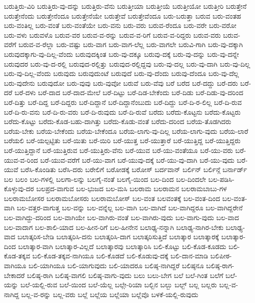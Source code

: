 {ಬರುತ್ತಿರು-ವಿರಿ
ಬರುತ್ತಿರು-ವು-ದನ್ನು
ಬರುತ್ತಿರು-ವೆನು
ಬರುತ್ತೀಯಾ
ಬರುತ್ತೀಯೆ
ಬರುತ್ತೀಯೋ
ಬರುತ್ತೀರಿ
ಬರುತ್ತೇನೆ
ಬರುತ್ತೇನೆಂದು
ಬರುತ್ತೇನೆಂದೂ
ಬರುತ್ತೇನೆಯೇ
ಬರುತ್ತೇವೆ
ಬರುತ್ತೇವೆಂದೂ
ಬರು-ಬರುತ್ತಾ
ಬರುವ
ಬರು-ವಂತಹ
ಬರು-ವಂತಿಲ್ಲ
ಬರು-ವಂತೆ
ಬರು-ವಂತೆಯೇ
ಬರು-ವನು
ಬರು-ವರು
ಬರುವ-ರೆಂದೂ
ಬರು-ವರೇ
ಬರು-ವರೋ
ಬರು-ವಳು
ಬರುವಳೊ
ಬರುವ-ವರ
ಬರುವ-ವ-ರನ್ನು
ಬರುವ-ವ-ರಿಗೆ
ಬರುವ-ವ-ರಿದ್ದರು
ಬರುವ-ವರು
ಬರುವ-ವರೆಗೆ
ಬರುವ-ವ-ರೆಲ್ಲಾ
ಬರು-ವಷ್ಟು
ಬರು-ವಾಗ
ಬರು-ವಾಗ-ಲೆಲ್ಲ
ಬರು-ವಾಗಲೇ
ಬರುವಿ-ಗಾಗಿ
ಬರು-ವು-ದಕ್ಕಾಗಿ
ಬರುವುದಕ್ಕಾಗು-ವು-ದಿಲ್ಲ-ವೆಂದು
ಬರುವುದಕ್ಕಿಂತ
ಬರು-ವು-ದಕ್ಕೂ
ಬರುವು-ದಕ್ಕೆ
ಬರು-ವು-ದನ್ನು
ಬರು-ವು-ದನ್ನೇ
ಬರುವುದರ
ಬರು-ವು-ದ-ರಲ್ಲಿ
ಬರುವುದ-ರಲ್ಲಿತ್ತು
ಬರುವುದ-ರಲ್ಲಿದ್ದವು
ಬರು-ವು-ದಲ್ಲ
ಬರು-ವು-ದಾಗಿ
ಬರು-ವು-ದಿಲ್ಲ
ಬರು-ವು-ದಿಲ್ಲ-ವೆಂದು
ಬರುವುದು
ಬರುವುದುಂಟೆ
ಬರುವುದೆ
ಬರು-ವು-ದೆಂದು
ಬರುವು-ದೆಂದೂ
ಬರು-ವು-ದೆಲ್ಲ
ಬರು-ವುದೇನು
ಬರುವುದೋ
ಬರು-ವುವು
ಬರು-ವುವೋ
ಬರುವೆ
ಬರು-ವೆವು
ಬರೆ
ಬರೆದ
ಬರೆ-ದದ್ದು
ಬರೆ-ದರು
ಬರೆ-ದರೆ
ಬರೆ-ದಳು
ಬರೆ-ದಾದ
ಬರೆ-ದಾದ-ಮೇಲೆ
ಬರೆ-ದಿಟ್ಟು
ಬರೆ-ದಿಡ-ಬೇಕೆಂದು
ಬರೆ-ದಿಡು
ಬರೆ-ದಿಡು-ವು-ದರಿಂದ
ಬರೆ-ದಿತ್ತು
ಬರೆ-ದಿದ್ದ
ಬರೆ-ದಿದ್ದರು
ಬರೆ-ದಿದ್ದಾನೆ
ಬರೆ-ದಿದ್ದಾನೆಂಬುದು
ಬರೆ-ದಿದ್ದು
ಬರೆ-ದಿ-ರ-ಲಿಲ್ಲ
ಬರೆ-ದಿ-ರುವ
ಬರೆ-ದಿ-ರು-ವನು
ಬರೆ-ದಿ-ರು-ವರು
ಬರೆ-ದಿ-ರುವುದು
ಬರೆ-ದಿ-ರುವೆ
ಬರೆದು
ಬರೆದು-ಕೊಟ್ಟನು
ಬರೆದು-ಕೊಟ್ಟರು
ಬರೆದು-ಕೊಟ್ಟು
ಬರೆದು-ಕೊಡ-ಬಹು-ದಾಗಿತ್ತು
ಬರೆದು-ಕೊಡು-ವಂತೆ
ಬರೆದು-ದರಿಂದ
ಬರೆಯ-ತೊಡಗಿದರು
ಬರೆಯ-ಬೇಕು
ಬರೆಯ-ಬೇಕೆಂದು
ಬರೆಯ-ಬೇಕೆಂದೂ
ಬರೆಯ-ಲಾಗು-ವು-ದಿಲ್ಲ
ಬರೆಯ-ಲಾಗು-ವುದು
ಬರೆಯ-ಲಾರೆ
ಬರೆಯಲಿ
ಬರೆ-ಯಲ್ಪಟ್ಟಿತು
ಬರೆ-ಯಿತು
ಬರೆ-ಯಿರಿ
ಬರೆ-ಯುತ್ತ
ಬರೆ-ಯುತ್ತಾರೆ
ಬರೆ-ಯುತ್ತಿದ್ದ
ಬರೆ-ಯುತ್ತಿದ್ದರು
ಬರೆ-ಯುತ್ತಿದ್ದಾನೆ
ಬರೆ-ಯುತ್ತಿರುವ
ಬರೆ-ಯುತ್ತಿರು-ವೆನು
ಬರೆ-ಯುವ
ಬರೆ-ಯು-ವಂತೆಯೂ
ಬರೆ-ಯು-ವರು
ಬರೆ-ಯುವ-ವ-ರಿಂದ
ಬರೆ-ಯುವ-ವರೆಗೆ
ಬರೆ-ಯು-ವಾಗ
ಬರೆ-ಯುವು-ದಕ್ಕೆ
ಬರೆ-ಯು-ವು-ದಾಗಿ
ಬರೆ-ಯು-ವುದು
ಬರೆ-ಯುವೆ
ಬರೆಸಿ-ಕೊಂಡಿತು
ಬರೆಸಿ-ದರು
ಬರೇಲಿಗೆ
ಬರೋಡಕ್ಕೆ
ಬರೋಸ್
ಬರ್ದವಾನ್
ಬರ್ಲಿನ್
ಬರ್ಲಿನ್ಗೆ
ಬರ್ನಾರ್ಡ್
ಬಲ
ಬಲಂ
ಬಲ-ಗಳಲ್ಲಿ
ಬಲಗಾ-ಲನ್ನು
ಬಲಗೈ-ನಂತೆ
ಬಲಗೈ-ಯಿಂದ
ಬಲ-ದಿಂದ
ಬಲ-ದಿಂದಲೇ
ಬಲ-ಪಡಿಸಿ-ಕೊಳ್ಳುವು-ದರ
ಬಲಪ್ರದ-ವಾಗುವ
ಬಲ-ಭುಜದ
ಬಲ-ಮಸಿ
ಬಲರಾಮ
ಬಲರಾಮನ
ಬಲರಾಮಬಾಬು-ಗಳ
ಬಲರಾಮಬೋಸರ
ಬಲರಾಮಬೋಸರು
ಬಲರಾಮಬೋಸ್
ಬಲ-ವಂತ
ಬಲವಂತಕ್ಕೆ
ಬಲ-ವಂತ-ದಿಂದ
ಬಲ-ವಂತ-ವಾಗಿ
ಬಲ-ವತ್ತರ-ವಾಗುತ್ತ
ಬಲ-ವನ್ನು
ಬಲ-ವನ್ನೆಲ್ಲ
ಬಲ-ವಾಗಿ
ಬಲ-ವಾಗಿದೆ
ಬಲ-ವಾಗಿದ್ದರೂ
ಬಲ-ವಾಗಿದ್ದರೇನೆ
ಬಲ-ವಾಗಿದ್ದು-ದರಿಂದ
ಬಲ-ವಾಗಿಯೇ
ಬಲ-ವಾಗಿರು-ವಂತೆ
ಬಲ-ವಾಗಿರು-ವುದು
ಬಲ-ವಾಗು-ವುದು
ಬಲ-ವಾದ
ಬಲ-ವಾದಾಗ
ಬಲ-ಶಾಲಿ-ಯಾದ
ಬಲ-ಹೀನ-ರಿಗೆ
ಬಲ-ಹೀನೇನ
ಬಲಾಢ್ಯ-ನನ್ನಾಗಿ
ಬಲಾಢ್ಯ-ನಾಗಿರ-ಬೇಕು
ಬಲಾಢ್ಯ-ವಾದ
ಬಲಾತ್ಕರಿಸ-ಬೇಡಿ
ಬಲಾತ್ಕರಿಸಿ-ದನು
ಬಲಾತ್ಕರಿಸಿ-ದಾಗ
ಬಲಾತ್ಕರಿಸುತ್ತಿದೆ
ಬಲಾತ್ಕಾರ
ಬಲಾತ್ಕಾರಕ್ಕೆ
ಬಲಾತ್ಕಾರ-ದಿಂದ
ಬಲಾತ್ಕಾರ-ವಾಗಿ
ಬಲಾತ್ಕಾರ-ವಿಲ್ಲದೆ
ಬಲಾತ್ಕಾರವು
ಬಲಾತ್ಕಾರಿಸಿ
ಬಲಿ-ಕೊಟ್ಟು
ಬಲಿ-ಕೊಡ-ಕೂಡದು
ಬಲಿ-ಕೊಡ-ತಕ್ಕವ
ಬಲಿ-ಕೊಡ-ತಕ್ಕವ-ನಾಗಿಯೂ
ಬಲಿ-ಕೊಡದೆ
ಬಲಿ-ಕೊಡುವು-ದಕ್ಕೆ
ಬಲಿ-ದಾನ-ಮಾಡಿ
ಬಲಿಪೀಠ-ವಾಗಿಯೂ
ಬಲಿ-ಯಾಗಿಯೂ
ಬಲಿ-ಯಾಗುವುದು
ಬಲಿ-ಯಾದರೂ
ಬಲಿಷ್ಠ-ನಾಗಿದ್ದರೆ
ಬಲಿಷ್ಠನೂ
ಬಲಿಷ್ಠ-ರಾಗ-ಬೇಕಾದರೆ
ಬಲಿಷ್ಠ-ರಾಗಿ
ಬಲಿಷ್ಠ-ವಾಗಲಿ
ಬಲಿಷ್ಠ-ವಾಗು-ವುದು
ಬಲು
ಬಲು-ಬೇಗ
ಬಲೆ
ಬಲೆ-ಗಿಂತ
ಬಲೆಗೆ
ಬಲೆ-ಯನ್ನು
ಬಲೆ-ಯಲ್ಲಿ-ರುವ
ಬಲೆ-ಯಿಂದ
ಬಲೆ-ಯೆಲ್ಲ
ಬಲ್ಗೇ-ರಿಯಾ
ಬಲ್ಬಿನ
ಬಲ್ಬು
ಬಲ್ಬ್
ಬಲ್ಲ
ಬಲ್ಲರು
ಬಲ್ಲ-ವ-ನಾಗಿದ್ದ
ಬಲ್ಲ-ವ-ರನ್ನು
ಬಲ್ಲ-ವರು
ಬಲ್ಲೆ
ಬಲ್ಲೆಯ
ಬಲ್ಲೆಯಾ
ಬಲ್ಲೆವೊ
ಬಳಕೆ-ಯಲ್ಲಿ-ರುವುದು
}
